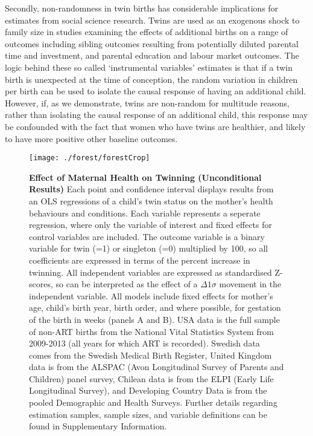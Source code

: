 \documentclass{nature}
\begin{document}
\begin{linenumbers}
Secondly, non-randomness in twin births has considerable implications for estimates from social science research.  Twins are used as an exogenous shock to family size in studies examining the effects of additional births on a range of outcomes including sibling outcomes resulting from potentially diluted parental time and investment, and parental education and labour market outcomes.  The logic behind these so called `instrumental variables' estimates is that if a twin birth is unexpected at the time of conception, the random variation in children per birth can be used to isolate the causal response of having an additional child.  However, if, as we demonstrate, twins are non-random for multitude reasons, rather than isolating the causal response of an additional child, this response may be confounded with the fact that women who have twins are healthier, and likely to have more positive other baseline outcomes.


\clearpage
%
\thispagestyle{empty}
\begin{spacing}{1}
\begin{figure}
\begin{center}
  \texttt{[image: ./forest/forestCrop]}
\end{center}
\caption{\textbf{Effect of Maternal Health on Twinning (Unconditional Results)} Each point and confidence interval displays results from an OLS regressions of a child's twin status on the mother's health behaviours and conditions. Each variable represents a seperate regression, where only the variable of interest and fixed effects for control variables are included. The outcome variable is a binary variable for twin (=1) or singleton (=0) multiplied by 100, so all coefficients are expressed in terms of the percent increase in twinning.  All independent variables are expressed as standardised Z-scores, so can be interpreted as the effect of a $\Delta 1\sigma$ movement in the independent variable. All models include fixed effects for mother's age, child's birth year, birth order, and where possible, for gestation of the birth in weeks (panels A and B).  USA data is the full sample of non-ART births from the National Vital Statistics System from 2009-2013 (all years for which ART is recorded).  Swedish data comes from the Swedish Medical Birth Register, United Kingdom data is from the ALSPAC (Avon Longitudinal Survey of Parents and Children) panel survey, Chilean data is from the ELPI (Early Life Longitudinal Survey), and Developing Country Data is from the pooled Demographic and Health Surveys.
  Further details regarding estimation samples, sample sizes, and variable definitions can be found in Supplementary Information.}
\label{fig:fullEsts}
\end{figure}



\end{spacing}
\end{linenumbers}
\end{document}
